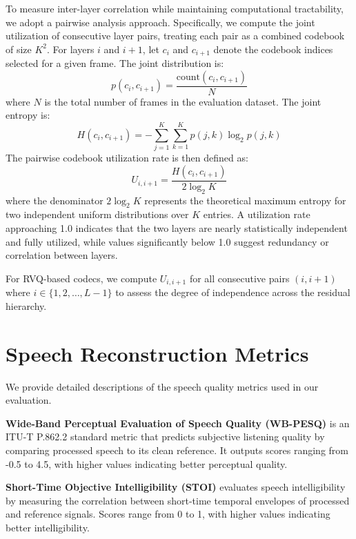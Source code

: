 \documentclass[11pt]{article}
\begin{document}
To measure inter-layer correlation while maintaining computational tractability, we adopt a pairwise analysis approach. Specifically, we compute the joint utilization of consecutive layer pairs, treating each pair as a combined codebook of size $K^2$. For layers $i$ and $i+1$, let $c_i$ and $c_{i+1}$ denote the codebook indices selected for a given frame. The joint distribution is:
\begin{equation}
p(c_i, c_{i+1}) = \frac{\text{count}(c_i, c_{i+1})}{N}
\end{equation}
where $N$ is the total number of frames in the evaluation dataset. The joint entropy is:
\begin{equation}
H(c_i, c_{i+1}) = -\sum_{j=1}^{K} \sum_{k=1}^{K} p(j, k) \log_2 p(j, k)
\end{equation}
The pairwise codebook utilization rate is then defined as:
\begin{equation}
U_{i,i+1} = \frac{H(c_i, c_{i+1})}{2\log_2 K}
\end{equation}
where the denominator $2\log_2 K$ represents the theoretical maximum entropy for two independent uniform distributions over $K$ entries. A utilization rate approaching 1.0 indicates that the two layers are nearly statistically independent and fully utilized, while values significantly below 1.0 suggest redundancy or correlation between layers.

For RVQ-based codecs, we compute $U_{i,i+1}$ for all consecutive pairs $(i, i+1)$ where $i \in \{1, 2, \ldots, L-1\}$ to assess the degree of independence across the residual hierarchy.

\section{Speech Reconstruction Metrics}
\label{app:3}

We provide detailed descriptions of the speech quality metrics used in our evaluation.

\noindent\textbf{Wide-Band Perceptual Evaluation of Speech Quality (WB-PESQ)} is an ITU-T P.862.2 standard metric that predicts subjective listening quality by comparing processed speech to its clean reference. It outputs scores ranging from -0.5 to 4.5, with higher values indicating better perceptual quality.

\noindent\textbf{Short-Time Objective Intelligibility (STOI)} evaluates speech intelligibility by measuring the correlation between short-time temporal envelopes of processed and reference signals. Scores range from 0 to 1, with higher values indicating better intelligibility.
\end{document}
